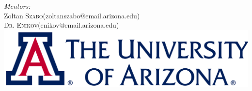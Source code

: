\begin{titlepage}
\large\emph{Mentors:}\\
Zoltan \textsc{Szabo}\small (zoltanszabo@email.arizona.edu)\\
\textsc{Dr. Enikov}\small (enikov@email.arizona.edu)\\[1.5cm]


\includegraphics[scale=0.3]{Graphics/logo.png}\\[1cm] %
 

\vfill %

\end{titlepage}